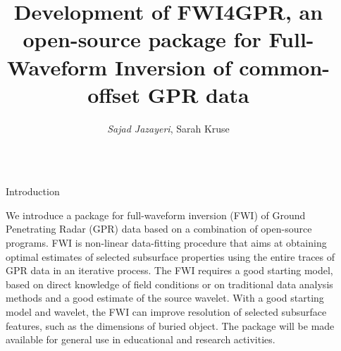 \documentclass[final]{beamer}
\title{\textbf{Development of \textbf{FWI4GPR}, an open-source package for Full-Waveform Inversion of common-offset GPR data}} %
\author{\textrm{\textit{Sajad Jazayeri}, Sarah Kruse}} %
\institute{\textrm{~~School of Geosciences, University of South Florida}} %
\newlength{\sepwid}
\newlength{\onecolwid}
\begin{document}

\setlength{\belowcaptionskip}{1ex} %
\setlength\belowdisplayshortskip{2ex} %

\begin{frame}[t] %

\begin{columns}[t] %

\begin{column}{\sepwid}\end{column} %

\begin{column}{\onecolwid} %


\begin{block}{Introduction}

We introduce a package for full-waveform inversion (FWI) of Ground Penetrating Radar (GPR) data based on a
combination of open-source programs. FWI is non-linear data-fitting procedure that aims at obtaining optimal estimates of selected subsurface properties using the entire traces of GPR data in an iterative process. The FWI requires a good starting model, based on direct knowledge of field conditions or on traditional data analysis methods and a good estimate of the source wavelet. With a good starting model and wavelet, the FWI can improve resolution of selected subsurface features, such as the dimensions of buried object. The package will be made available for general use in educational and research activities.

\end{block}

\vspace*{2cm}


\end{column}
\end{columns}
\end{frame}
\end{document}
